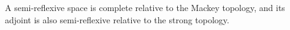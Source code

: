 A semi-reflexive space is complete relative to the Mackey topology, and its adjoint is also semi-reflexive relative to the strong topology.

